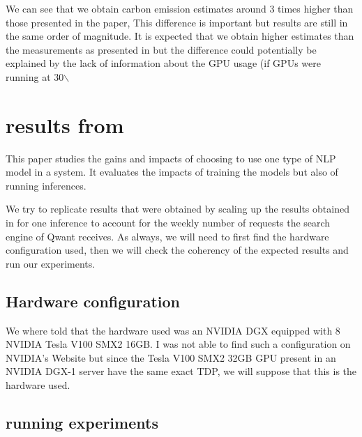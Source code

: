 \documentclass[11pt]{article}
\begin{document}
We can see that we obtain carbon emission estimates around 3 times higher than
those presented in the paper, This difference is important but results
are still in the same order of magnitude. It is expected that we obtain higher
estimates than the measurements as presented in
\cite{Jay2023experimental} but the difference could potentially be
explained by the lack of information about the GPU usage (if GPUs were
running at 30$\backslash$%

\section{results from \cite{Cattan2022benchmarking}}
\label{sec:org1eeb34d}
\label{sec:cattan}
This paper studies the gains and impacts of choosing to use one type
of NLP model in a system. It evaluates the impacts of training the
models but also of running inferences.


We try to replicate results that were obtained by scaling up the results obtained in
\cite{Cattan2022benchmarking} for one inference to account for the
weekly number of requests the search engine of Qwant receives.
As always, we will need to first find the hardware configuration used,
then we will check the coherency of the expected results and run our experiments.

\subsection{Hardware configuration}
\label{sec:org35b3b21}

We where told that the hardware used was an NVIDIA DGX equipped with 8
NVIDIA Tesla V100 SMX2 16GB. I was not able to find such a
configuration on NVIDIA's Website but since the Tesla V100 SMX2 32GB
GPU present in an NVIDIA DGX-1 server have the same exact \gls{TDP}, we will
suppose that this is the hardware used.

\subsection{running experiments}
\label{sec:orgdae255c}
\end{document}
